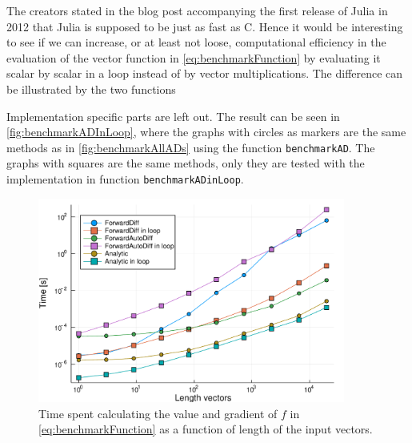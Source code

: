 The creators stated in the blog post accompanying the first release of Julia in 2012 \emph{\citep{juliaBlogRelease2012}} that Julia is supposed to be just as fast as C. Hence it would be interesting to see if we can increase, or at least not loose, computational efficiency in the evaluation of the vector function in \eqref{eq:benchmarkFunction} by evaluating it scalar by scalar in a loop instead of by vector multiplications. The difference can be illustrated by the two functions

Implementation specific parts are left out. The result can be seen in \autoref{fig:benchmarkADInLoop}, where the graphs with circles as markers are the same methods as in \autoref{fig:benchmarkAllADs} using the function \texttt{benchmarkAD}. The graphs with squares are the same methods, only they are tested with the implementation in function \texttt{benchmarkADinLoop}.
\begin{figure}[H]
    \centering
    \includegraphics[width = 0.9\textwidth]{figures/benchmark_ad_in_loop.pdf}
    \caption{Time spent calculating the value and gradient of $f$ in \eqref{eq:benchmarkFunction} as                         a function of length of the input vectors.}
    \label{fig:benchmarkADInLoop}
\end{figure}

